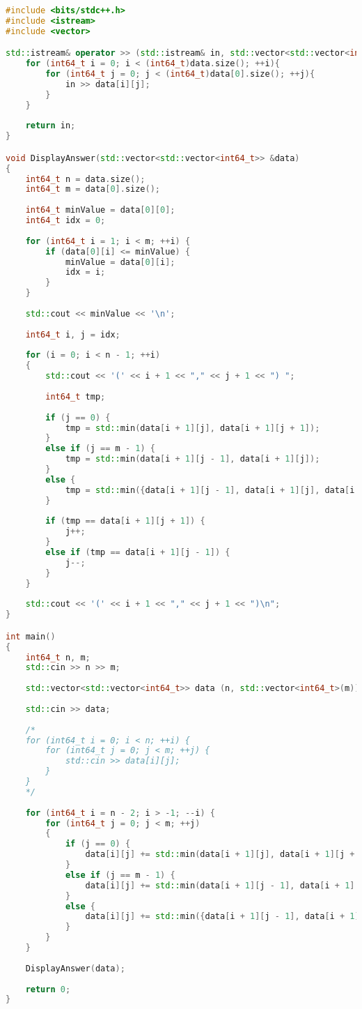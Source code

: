 \begin{lstlisting}[language=C++]
#include <bits/stdc++.h>
#include <istream>
#include <vector>

std::istream& operator >> (std::istream& in, std::vector<std::vector<int64_t>> &data) {
	for (int64_t i = 0; i < (int64_t)data.size(); ++i){
		for (int64_t j = 0; j < (int64_t)data[0].size(); ++j){
			in >> data[i][j];
		}
	}
	
	return in;
}

void DisplayAnswer(std::vector<std::vector<int64_t>> &data)
{
	int64_t n = data.size();
	int64_t m = data[0].size(); 
	
	int64_t minValue = data[0][0];
	int64_t idx = 0;
	
	for (int64_t i = 1; i < m; ++i) {
		if (data[0][i] <= minValue) {
			minValue = data[0][i];
			idx = i;
		}
	}
	
	std::cout << minValue << '\n';
	
	int64_t i, j = idx;
	
	for (i = 0; i < n - 1; ++i) 
	{
		std::cout << '(' << i + 1 << "," << j + 1 << ") ";
		
		int64_t tmp;
		
		if (j == 0) {
			tmp = std::min(data[i + 1][j], data[i + 1][j + 1]);
		} 
		else if (j == m - 1) {
			tmp = std::min(data[i + 1][j - 1], data[i + 1][j]);
		}
		else {
			tmp = std::min({data[i + 1][j - 1], data[i + 1][j], data[i + 1][j + 1]});
		}
		
		if (tmp == data[i + 1][j + 1]) {
			j++;
		}
		else if (tmp == data[i + 1][j - 1]) {
			j--;
		}
	}
	
	std::cout << '(' << i + 1 << "," << j + 1 << ")\n";
}

int main() 
{
	int64_t n, m;
	std::cin >> n >> m;
	
	std::vector<std::vector<int64_t>> data (n, std::vector<int64_t>(m));
	
	std::cin >> data;
	
	/*
	for (int64_t i = 0; i < n; ++i) {
		for (int64_t j = 0; j < m; ++j) {
			std::cin >> data[i][j];
		}
	}
	*/
	
	for (int64_t i = n - 2; i > -1; --i) {
		for (int64_t j = 0; j < m; ++j) 
		{
			if (j == 0) {
				data[i][j] += std::min(data[i + 1][j], data[i + 1][j + 1]);
			}
			else if (j == m - 1) {
				data[i][j] += std::min(data[i + 1][j - 1], data[i + 1][j]);
			} 
			else {
				data[i][j] += std::min({data[i + 1][j - 1], data[i + 1][j], data[i + 1][j + 1]});
			}
		}
	}
	
	DisplayAnswer(data);
	
	return 0;
}

\end{lstlisting}

\pagebreak

